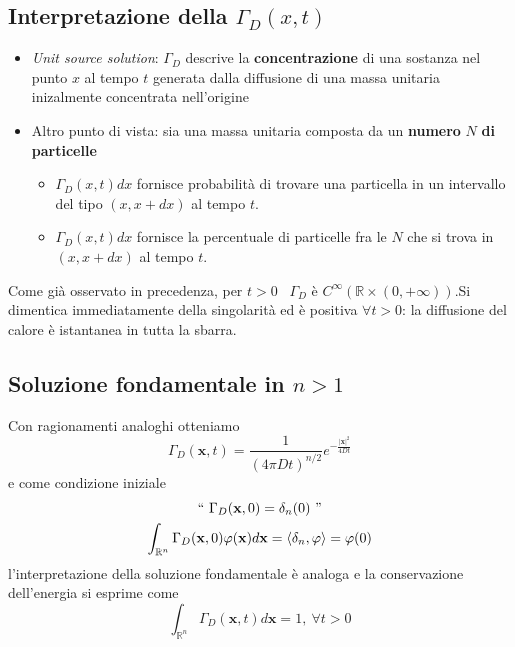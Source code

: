 \documentclass[10pt,a4paper,twoside,openright]{book}
\begin{document}
\subsection{Interpretazione della \texorpdfstring{$\displaystyle \Gamma _{D}(x,t)$}{soluzione}}
\begin{itemize}
\item \textit{Unit source solution}: $\displaystyle \Gamma _{D}$ descrive la \textbf{concentrazione} di una sostanza nel punto $\displaystyle x$ al tempo $\displaystyle t$ generata dalla diffusione di una massa unitaria inizalmente concentrata nell'origine
\item Altro punto di vista: sia una massa unitaria composta da un \textbf{numero }$\displaystyle N$\textbf{ di particelle}
\begin{itemize}
\item $\displaystyle \Gamma _{D}(x,t) dx$ fornisce probabilità di trovare una particella in un intervallo del tipo $\displaystyle (x,x+dx)$ al tempo $\displaystyle t$.
\item $\displaystyle \Gamma _{D}(x,t) dx$ fornisce la percentuale di particelle fra le $\displaystyle N$ che si trova in $\displaystyle (x,x+dx)$ al tempo $\displaystyle t$.
\end{itemize}
\end{itemize}
\begin{nb}
Come già osservato in precedenza, per $\displaystyle t >0$ \ $\displaystyle \Gamma _{D}$ è $\displaystyle C^{\infty }(\mathbb{R} \times (0,+\infty)) .$Si dimentica immediatamente della singolarità ed è positiva $\displaystyle \forall t >0$: la diffusione del calore è istantanea in tutta la sbarra.
\end{nb}
\subsection{Soluzione fondamentale in \texorpdfstring{$n>1$}{n>1}}

Con ragionamenti analoghi otteniamo
\begin{equation*}
\Gamma _{D}(\mathbf{x},t) =\frac{1}{(4\pi Dt)^{n/2}} e^{-\frac{| \mathbf{x}| ^{2}}{4Dt}}
\end{equation*}
e come condizione iniziale
\begin{gather*}
``\ \Gamma _{D}(\mathbf{x},0) =\delta _{n}(0) \ "\\
\int _{\mathbb{R}^{n}} \Gamma _{D}(\mathbf{x},0) \varphi (\mathbf{x}) d\mathbf{x} =\langle \delta _{n},\varphi \rangle =\varphi (0)
\end{gather*}
l'interpretazione della soluzione fondamentale è analoga e la conservazione dell'energia si esprime come\begin{equation*}
\int _{\mathbb{R}^{n}} \Gamma _{D}(\mathbf{x},t) d\mathbf{x} =1,\ \forall t >0
\end{equation*}
\end{document}
